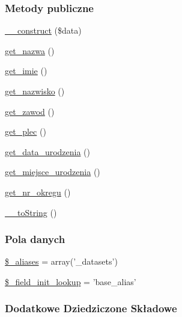 \subsubsection*{Metody publiczne}
\begin{DoxyCompactItemize}
\item 
\hyperlink{classep_____dataset_ab452db2d5d284bffa31c9accbaeec836}{\-\_\-\-\_\-construct} (\$data)
\item 
\hyperlink{classep_____dataset_ac0818f0049d7b84f08f77128f54cee36}{get\-\_\-nazwa} ()
\item 
\hyperlink{classep_____dataset_ac4b0c85dc2a130038f2d118dbd0c3d77}{get\-\_\-imie} ()
\item 
\hyperlink{classep_____dataset_abdd1d7ff92508da7f748ba1feec97af0}{get\-\_\-nazwisko} ()
\item 
\hyperlink{classep_____dataset_af80ca8310b60004454dd02a387deaa2c}{get\-\_\-zawod} ()
\item 
\hyperlink{classep_____dataset_ac7f9af5c3fa024e4c26a7b6bd4ce4bb4}{get\-\_\-plec} ()
\item 
\hyperlink{classep_____dataset_a880b240cd2d8c336fd1709bf0cb1ae2c}{get\-\_\-data\-\_\-urodzenia} ()
\item 
\hyperlink{classep_____dataset_ac57c08ec5e394a19c5bd9280c8376182}{get\-\_\-miejsce\-\_\-urodzenia} ()
\item 
\hyperlink{classep_____dataset_a2645a9f0aa5b0ccc482943348c033d0a}{get\-\_\-nr\-\_\-okregu} ()
\item 
\hyperlink{classep_____dataset_a7516ca30af0db3cdbf9a7739b48ce91d}{\-\_\-\-\_\-to\-String} ()
\end{DoxyCompactItemize}
\subsubsection*{Pola danych}
\begin{DoxyCompactItemize}
\item 
\hyperlink{classep_____dataset_ab4e31d75f0bc5d512456911e5d01366b}{\$\-\_\-aliases} = array('\-\_\-datasets')
\item 
\hyperlink{classep_____dataset_a4a4d54ae35428077a7c61ec8a5139af3}{\$\-\_\-field\-\_\-init\-\_\-lookup} = 'base\-\_\-alias'
\end{DoxyCompactItemize}
\subsubsection*{Dodatkowe Dziedziczone Składowe}



